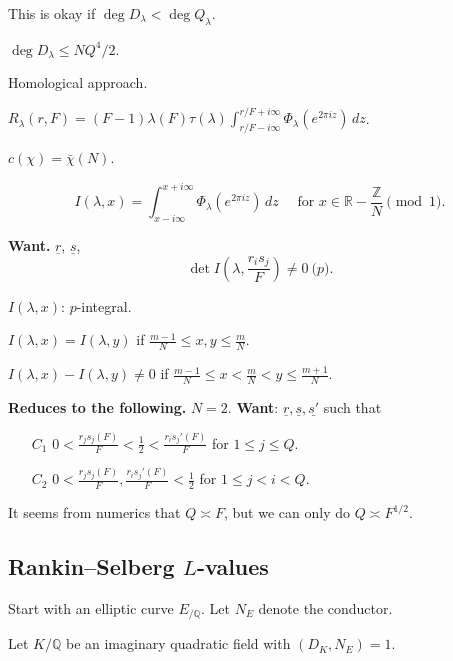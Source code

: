 \documentclass[reqno]{amsart} 
\begin{document}
This is okay if $\deg D_\lambda < \deg Q_\lambda$.

$\deg D_\lambda \leq N Q^4/2$.

Homological approach.

$R_\lambda(r, F) =(F - 1) \lambda(F) \tau(\lambda) \int_{r/F - i \infty}^{r/F + i \infty} \Phi_\lambda \left( e^{2 \pi i z} \right) \, d z$.

$c(\chi) = \bar{\chi}(N)$.

\begin{equation*}
  I(\lambda, x) = \int_{x - i \infty}^{x + i \infty}
  \Phi_\lambda(e^{2 \pi i z}) \, d z
  \quad \text{ for } x \in \mathbb{R} - \frac{\mathbb{Z}}{N} \pmod{1}.
\end{equation*}

\textbf{Want.} $\underline{r}$, $\underline{s}$,
\begin{equation*}
\det I \left( \lambda, \frac{r_i s_j}{F} \right) \neq 0 \pod{p}.
\end{equation*}

$I(\lambda, x)$: $p$-integral.

$I(\lambda, x) = I(\lambda, y)$ if $\frac{m - 1}{N} \leq x, y \leq \frac{m}{N}$.

$I(\lambda, x) - I(\lambda, y) \neq 0$ if $\frac{m - 1}{N} \leq x < \frac{m}{N} < y \leq \frac{m + 1}{N}$.

\textbf{Reduces to the following.}
$N = 2$.  \textbf{Want}: $\underline{r}, \underline{s}, \underline{s'}$ such that
\begin{enumerate}
\item[$C_1$] $0 < \frac{r_j s_j(F) }{F} < \frac{1}{2} < \frac{r_i s_j '(F) }{F}$ for $1 \leq j \leq Q$.
\item[$C_2$] $0 < \frac{r_j s_j(F) }{F}, \frac{r_i s_j '(F) }{F} < \frac{1}{2}$ for $1 \leq j < i < Q$.
\end{enumerate}

\begin{remark}
  It seems from numerics that $Q \asymp F$, but we can only do $Q \asymp F^{1/2}$.
\end{remark}

\subsection{Rankin--Selberg $L$-values}
Start with an elliptic curve $E_{/\mathbb{Q}}$.  Let $N_E$ denote the conductor.

Let $K/\mathbb{Q}$ be an imaginary quadratic field with $(D_K, N_E) = 1$.
\end{document}
